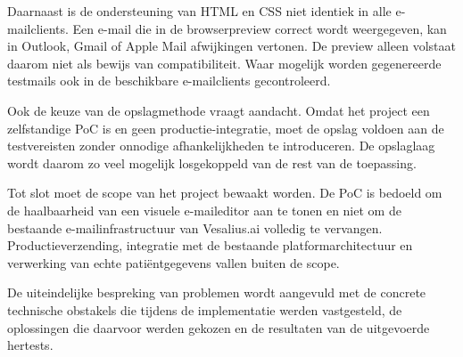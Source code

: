 Daarnaast is de ondersteuning van HTML en CSS niet identiek in alle
e-mailclients. Een e-mail die in de browserpreview correct wordt weergegeven,
kan in Outlook, Gmail of Apple Mail afwijkingen vertonen. De preview alleen
volstaat daarom niet als bewijs van compatibiliteit. Waar mogelijk worden
gegenereerde testmails ook in de beschikbare e-mailclients gecontroleerd.

Ook de keuze van de opslagmethode vraagt aandacht. Omdat het project een
zelfstandige PoC is en geen productie-integratie, moet de opslag voldoen aan
de testvereisten zonder onnodige afhankelijkheden te introduceren. De
opslaglaag wordt daarom zo veel mogelijk losgekoppeld van de rest van de
toepassing.

Tot slot moet de scope van het project bewaakt worden. De PoC is bedoeld om
de haalbaarheid van een visuele e-maileditor aan te tonen en niet om de
bestaande e-mailinfrastructuur van Vesalius.ai volledig te vervangen.
Productieverzending, integratie met de bestaande platformarchitectuur en
verwerking van echte patiëntgegevens vallen buiten de scope.

De uiteindelijke bespreking van problemen wordt aangevuld met de concrete
technische obstakels die tijdens de implementatie werden vastgesteld, de
oplossingen die daarvoor werden gekozen en de resultaten van de uitgevoerde
hertests.
